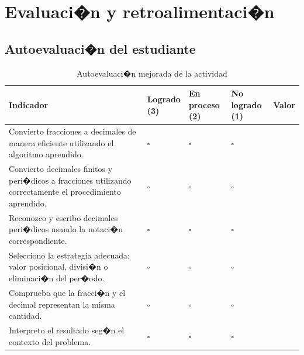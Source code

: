 \documentclass[
	spanish,
	letterpaper, oneside
]{article}
\begin{document}
\section{Evaluaci�n y retroalimentaci�n}

\subsection{Autoevaluaci�n del estudiante}

\begin{table}[H]
\centering
\caption{Autoevaluaci�n mejorada de la actividad}
\label{tab:autoevaluacion}

\small
\renewcommand{\arraystretch}{1.45}
\setlength{\tabcolsep}{5pt}

\begin{tabularx}{\textwidth}{@{}
>{\raggedright\arraybackslash}X
>{\centering\arraybackslash}p{}
>{\centering\arraybackslash}p{}
>{\centering\arraybackslash}p{}
>{\centering\arraybackslash}p{}
@{}}
\toprule
\textbf{Indicador} &
\makecell{\textbf{Logrado}\\\textbf{(3)}} &
\makecell{\textbf{En proceso}\\\textbf{(2)}} &
\makecell{\textbf{No logrado}\\\textbf{(1)}} &
\textbf{Valor} \\
\midrule

Convierto fracciones a decimales de manera eficiente utilizando el algoritmo aprendido.
& $\square$ & $\square$ & $\square$ & \\

Convierto decimales finitos y peri�dicos a fracciones utilizando correctamente el procedimiento aprendido.
& $\square$ & $\square$ & $\square$ & \\

Reconozco y escribo decimales peri�dicos usando la notaci�n correspondiente.
& $\square$ & $\square$ & $\square$ & \\

Selecciono la estrategia adecuada: valor posicional, divisi�n o eliminaci�n del per�odo.
& $\square$ & $\square$ & $\square$ & \\

Compruebo que la fracci�n y el decimal representan la misma cantidad.
& $\square$ & $\square$ & $\square$ & \\

Interpreto el resultado seg�n el contexto del problema.
& $\square$ & $\square$ & $\square$ & \\

\bottomrule
\end{tabularx}

\end{table}
\end{document}
